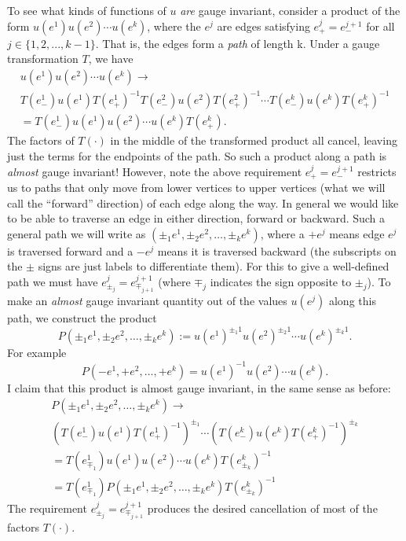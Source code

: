 \documentclass[9pt,twocolumn,twoside]{article}
\begin{document}
To see what kinds of functions of $u$ \textit{are} gauge invariant, consider a product of the form $u(e^1)u(e^2)\cdots u(e^k)$, where the $e^j$ are edges satisfying $e_+^j=e_-^{j+1}$ for all $j\in\{1,2,...,k-1\}$.  That is, the edges form a \textit{path} of length k.  Under a gauge transformation $T$, we have 
\begin{multline*}
u(e^1)u(e^2)\cdots u(e^k) \rightarrow  \\
T(e_-^1)u(e^1)T(e_+^1)^{-1} T(e_-^2)u(e^2)T(e_+^2)^{-1} \cdots T(e_-^k)u(e^k)T(e_+^k)^{-1} \\ 
=  T(e_-^1)u(e^1)u(e^2)\cdots u(e^k)T(e_+^k). 
\end{multline*}
The factors of $T(\cdot)$ in the middle of the transformed product all cancel, leaving just the terms for the endpoints of the path.  So such a product along a path is \textit{almost} gauge invariant!  However, note the above requirement $e_+^j=e_-^{j+1}$ restricts us to paths that only move from lower vertices to upper vertices (what we will call the ``forward'' direction) of each edge along the way.  In general we would like to be able to traverse an edge in either direction, forward or backward.  Such a general path we will write as $(\pm_1 e^1, \pm_2 e^2, \dots , \pm_k e^k)$, where a $+e^j$ means edge $e^j$ is traversed forward and a $-e^j$ means it is traversed backward (the subscripts on the $\pm$ signs are just labels to differentiate them).  For this to give a well-defined path we must have $e^j_{\pm_j} = e^{j+1}_{\mp_{j+1}}$ (where $\mp_j$ indicates the sign opposite to $\pm_j$).  To make an \textit{almost} gauge invariant quantity out of the values $u(e^j)$ along this path, we construct the product 
\[P(\pm_1 e^1, \pm_2 e^2, \dots , \pm_k e^k) := u(e^1)^{\pm_1 1} u(e^2)^{\pm_2 1} \cdots u(e^k)^{\pm_k 1}.\]
For example 
\[P(-e^1,+e^2,\dots,+e^k) = u(e^1)^{-1} u(e^2)\cdots u(e^k).\]
I claim that this product is almost gauge invariant, in the same sense as before:
\begin{multline*}
P(\pm_1 e^1,\pm_2 e^2,\dots,\pm_k e^k) \rightarrow \\
\left(T(e_-^1)u(e^1)T(e_+^1)^{-1}\right)^{\pm_1} \cdots \left(T(e_-^k)u(e^k)T(e_+^k)^{-1}\right)^{\pm_k} \\
= T(e_{\mp_1}^1) u(e^1) u(e^2) \cdots u(e^k) T(e_{\pm_k}^k)^{-1} \\
= T(e_{\mp_1}^1) P(\pm_1 e^1,\pm_2 e^2,\dots,\pm_k e^k) T(e_{\pm_k}^k)^{-1}
\end{multline*}
The requirement $e^j_{\pm_j} = e^{j+1}_{\mp_{j+1}}$ produces the desired cancellation of most of the factors $T(\cdot)$.  
\end{document}
